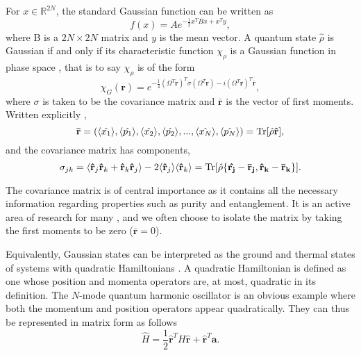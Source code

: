 \documentclass[11pt,a4paper,openbib]{article}
\numberwithin{equation}{section}
\begin{document}
For $x \in \mathbb{R}^{2N}$, the standard Gaussian function can be written as \cite{Adesso14}
\begin{equation} \label{eq:16}
f(x) = Ae^{-\frac{1}{2}x^{T}Bx+ x^{T} y},
\end{equation}
where B is a $2N \times 2N$ matrix and $y$ is the mean vector. A quantum state $\hat{\rho}$ is Gaussian if and only if its characteristic function $\chi_\rho$ is a Gaussian function in phase space \cite{Schumaker86}, that is to say $\chi_\rho$ is of the form
\begin{equation} \label{eq:17}
\chi_G(\mathbf{r}) = e^{-\frac{1}{4}(\Omega^T\mathbf{r})^T\sigma(\Omega^T\mathbf{r}) - i(\Omega^T\mathbf{r})^T\mathbf{\bar{r}}},
\end{equation} where $\sigma$ is taken to be the covariance matrix and $\mathbf{\bar{r}}$ is the vector of first moments. Written explicitly \cite{Adesso14},
\begin{equation} \label{eq:18}
\mathbf{\bar{r}} = (\langle\hat{x_1}\rangle, \langle\hat{p_1}\rangle, \langle\hat{x_2}\rangle, \langle\hat{p_2}\rangle, ..., \langle\hat{x_N}\rangle, \langle\hat{p_N}\rangle) = \Tr[\hat{\rho} \mathbf{\hat{r}}] ,
\end{equation}
and the covariance matrix has components,
\begin{equation} \label{eq:19}
\sigma_{jk} = \langle \mathbf{\hat{r}}_j\mathbf{\hat{r}}_k + \mathbf{\hat{r}}_k\mathbf{\hat{r}}_j \rangle - 2\langle \mathbf{\hat{r}}_j \rangle \langle \mathbf{\hat{r}}_k \rangle = \Tr[\hat{\rho} \{\mathbf{\hat{r_j}} - \mathbf{\bar{r}_j}, \mathbf{\hat{r}_k} - \mathbf{\bar{r}_k}\}].
\end{equation}


The covariance matrix is of central importance as it contains all the necessary information regarding properties such as purity and entanglement. It is an active area of research for many \cite{Adesso07, Plenio03}, and we often choose to isolate the matrix by taking the first moments to be zero ($\mathbf{\bar{r}} = 0$).

Equivalently, Gaussian states can be interpreted as the ground and thermal states of systems with quadratic Hamiltonians \cite{Genoni16}. A quadratic Hamiltonian is defined as one whose position and momenta operators are, at most, quadratic in its definition. The $N$-mode quantum harmonic oscillator is an obvious example where both the momentum and position operators appear quadratically. They can thus be represented in matrix form as follows
\begin{equation} \label{eq:20}
\hat{H} = \frac{1}{2}\mathbf{\hat{r}}^{T}H\mathbf{\hat{r}}+\mathbf{\hat{r}}^{T}\mathbf{a}.
\end{equation}
\end{document}
